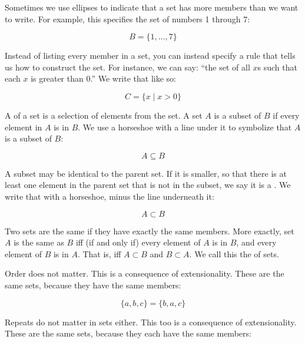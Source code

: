 \documentclass[../../../main.tex]{subfiles}
\begin{document}
\noindent
Sometimes we use ellipses to indicate that a set has more members than we want to write. For example, this specifies the set of numbers 1 through 7:

\begin{equation*}
B = \{ 1, \ldots, 7 \}
\end{equation*}

\noindent
Instead of listing every member in a set, you can instead specify a rule that tells us how to construct the set. For instance, we can say: ``the set of all $x$s such that each $x$ is greater than $0$.'' We write that like so:

\begin{equation*}
C = \{ x \mid x > 0 \}
\end{equation*}

\noindent
A  of a set is a selection of elements from the set. A set $A$ is a subset of $B$ if every element in $A$ is in $B$. We use a horseshoe with a line under it to symbolize that $A$ is a subset of $B$:

\begin{equation*}
A \subseteq B
\end{equation*}

\noindent
A subset may be identical to the parent set. If it is smaller, so that there is at least one element in the parent set that is not in the subset, we say it is a . We write that with a horseshoe, minus the line underneath it:

\begin{equation*}
A \subset B
\end{equation*}

\noindent
Two sets are the same if they have exactly the same members. More exactly, set $A$ is the same as $B$ iff (if and only if) every element of $A$ is in $B$, and every element of $B$ is in $A$. That is, iff $A \subset B$ and $B \subset A$. We call this the  of sets.

Order does not matter. This is a consequence of extensionality. These are the same sets, because they have the same members:

\begin{equation*}
\{ a, b, c \} = \{ b, a, c \}
\end{equation*}

\noindent
Repeats do not matter in sets either. This too is a consequence of extensionality. These are the same sets, because they each have the same members:
\end{document}
